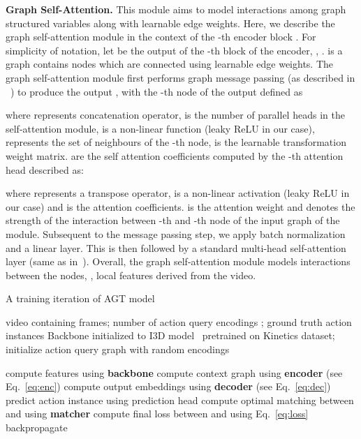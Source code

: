 \documentclass[10pt,twocolumn,letterpaper]{article}
\begin{document}
\vspace{0.05in}
\noindent
\textbf{Graph Self-Attention.} This module aims to model interactions among graph structured variables along with learnable edge weights. Here, we describe the graph self-attention module in the context of the -th encoder block . For simplicity of notation, let  be the output of the -th block of the encoder, \ie, .  is a graph contains  nodes  which are connected using learnable edge weights. The graph self-attention module first performs graph message passing (as described in ~\cite{velivckovic2017graph}) to produce the output , with the -th node of the output defined as

where  represents concatenation operator,  is the number of parallel heads in the self-attention module,  is a non-linear function (leaky ReLU in our case),  represents the set of neighbours of the -th node,  is the learnable transformation weight matrix.  are the self attention coefficients computed by the -th attention head described as:

where  represents a transpose operator,  is a non-linear activation (leaky ReLU in our case) and  is the attention coefficients.  is the attention weight and denotes the strength of the interaction between -th and -th node of the input graph of the module.
Subsequent to the message passing step, we apply batch normalization and a linear layer. This is then followed by a standard multi-head self-attention layer (same as in~\cite{vaswani2017attention}). 
Overall, the graph self-attention module models interactions between the nodes, \ie, local features derived from the video. 


\begin{algorithm}[t]
\caption{A training iteration of AGT model}
\label{algo}
\begin{algorithmic}[1]
\renewcommand{\algorithmicensure}{\textbf{Inputs:}}
\Ensure video  containing  frames; number of action query encodings ; ground truth action instances 
\renewcommand{\algorithmicensure}{\textbf{Initializations:}}
\Ensure Backbone initialized to I3D model~\cite{carreira2017quo} pretrained on Kinetics dataset; initialize action query graph  with  random encodings

\State compute features using \textbf{backbone}\;
\State compute context graph using \textbf{encoder} (see Eq.~\ref{eq:enc})\;
\State compute output embeddings using \textbf{decoder} (see Eq.~\ref{eq:dec})\;
\For{}
    \State predict action instance  using prediction head \;
    \EndFor
\State compute optimal matching  between  and  using \textbf{matcher} \;
\State compute final loss  between  and  using Eq.~\ref{eq:loss}\;
\State backpropagate 
\end{algorithmic}
\end{algorithm} 
\end{document}
